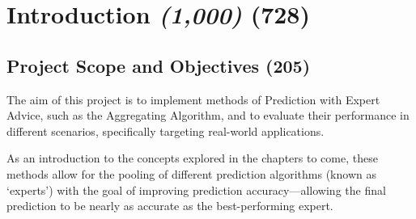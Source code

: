 \section{Introduction \textit{(1,000)} \textbf{(728)}}\label{section:Introduction}





\subsection{Project Scope and Objectives \textbf{(205)}}
The aim of this project is to implement methods of Prediction with Expert Advice, such as the Aggregating Algorithm, and to evaluate their performance in different scenarios, specifically targeting  real-world applications. 

As an introduction to the concepts explored in the chapters to come, these methods allow for the pooling of different prediction algorithms (known as `experts') with the goal of improving prediction accuracy---allowing the final prediction to be nearly as accurate as the best-performing expert.

